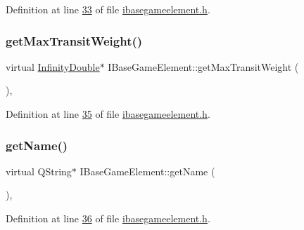 Definition at line \hyperlink{a00047_source_l00033}{33} of file \hyperlink{a00047_source}{ibasegameelement.\+h}.

\mbox{\label{a00137_a4c74c903e19ada9da9150cf9569b4e9d}} 
\subsubsection{\texorpdfstring{get\+Max\+Transit\+Weight()}{getMaxTransitWeight()}}
{\footnotesize\ttfamily virtual \hyperlink{a00161}{Infinity\+Double}$\ast$ I\+Base\+Game\+Element\+::get\+Max\+Transit\+Weight (\begin{DoxyParamCaption}{ }\end{DoxyParamCaption})\hspace{0.3cm}{\ttfamily [inline]}, {\ttfamily [virtual]}}



Definition at line \hyperlink{a00047_source_l00035}{35} of file \hyperlink{a00047_source}{ibasegameelement.\+h}.

\mbox{\label{a00137_a01051b9a502128a82f9a168a14d1ecdc}} 
\subsubsection{\texorpdfstring{get\+Name()}{getName()}}
{\footnotesize\ttfamily virtual Q\+String$\ast$ I\+Base\+Game\+Element\+::get\+Name (\begin{DoxyParamCaption}{ }\end{DoxyParamCaption})\hspace{0.3cm}{\ttfamily [inline]}, {\ttfamily [virtual]}}



Definition at line \hyperlink{a00047_source_l00036}{36} of file \hyperlink{a00047_source}{ibasegameelement.\+h}.

\mbox{\label{a00137_a3159c02c1118989e3476b52d89a52401}} 
